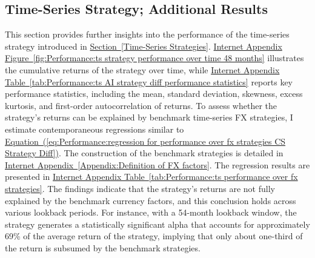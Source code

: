 \documentclass[12pt,oneside,letter]{article}
\newcommand*{\mysec}[1]{\hyperref[{#1}]{Section~\ref*{#1}}}
\newcommand*{\myeq}[1]{\hyperref[{#1}]{Equation~(\ref*{#1})}}
\newcommand*{\mytabIA}[1]{\hyperref[{#1}]{Internet Appendix Table~\ref*{#1}}}
\newcommand*{\myfigIA}[1]{\hyperref[{#1}]{Internet Appendix Figure~\ref*{#1}}}
\newcommand*{\mysecIA}[1]{\hyperref[{#1}]{Internet Appendix~\ref*{#1}}}
\begin{document}
\begin{appendices}
		\section{Time-Series Strategy; Additional Results} 	\label{Appendix: Time-Series Strategy; More Results}
		This section provides further insights into the performance of the time-series strategy introduced in \mysec{Time-Series Strategies}. \myfigIA{fig:Performance:ts strategy performance over time 48 months} illustrates the cumulative returns of the strategy over time, while \mytabIA{tab:Performance:ts AI strategy diff performance statistics} reports key performance statistics, including the mean, standard deviation, skewness, excess kurtosis, and first-order autocorrelation of returns. To assess whether the strategy's returns can be explained by benchmark time-series FX strategies, I estimate contemporaneous regressions similar to \myeq{eq:Performance:regression for performance over fx strategies CS Strategy Diff}. The construction of the benchmark strategies is detailed in \mysecIA{Appendix:Definition of FX factors}. The regression results are presented in \mytabIA{tab:Performance:ts performance over fx strategies}. The findings indicate that the strategy’s returns are not fully explained by the benchmark currency factors, and this conclusion holds across various lookback periods. For instance, with a 54-month lookback window, the strategy generates a statistically significant alpha that accounts for approximately 69\% of the average return of the strategy, implying that only about one-third of the return is subsumed by the benchmark strategies. 


\end{appendices}
\end{document}
